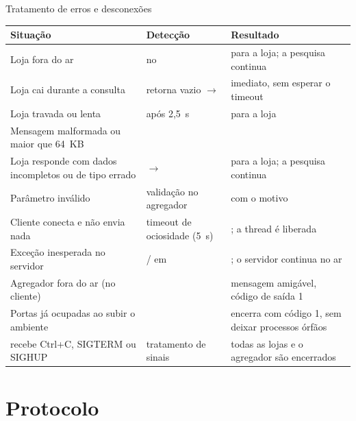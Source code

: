 \begin{quadro}[!htbp]
  \centering\small
  \caption{Tratamento de erros e desconexões}\label{qua:falhas}
  \begin{tabularx}{\textwidth}{|L{4.3cm}|L{4.4cm}|Y|}
    \hline
    \textbf{Situação} & \textbf{Detecção} & \textbf{Resultado} \\ \hline
    Loja fora do ar &  no  &  para a loja; a pesquisa continua \\ \hline
    Loja cai durante a consulta &  retorna vazio $\rightarrow$  &  imediato, sem esperar o timeout \\ \hline
    Loja travada ou lenta &  após 2,5~s &  para a loja \\ \hline
    Mensagem malformada ou maior que 64~KB &  &  \\ \hline
    Loja responde  com dados incompletos ou de tipo errado &  $\rightarrow$  &  para a loja; a pesquisa continua \\ \hline
    Parâmetro inválido & validação no agregador &  com o motivo \\ \hline
    Cliente conecta e não envia nada & timeout de ociosidade (5~s) & ; a thread é liberada \\ \hline
    Exceção inesperada no servidor & / em  & ; o servidor continua no ar \\ \hline
    Agregador fora do ar (no cliente) &  & mensagem amigável, código de saída 1 \\ \hline
    Portas já ocupadas ao subir o ambiente &  & encerra com código 1, sem deixar processos órfãos \\ \hline
     recebe Ctrl+C, SIGTERM ou SIGHUP & tratamento de sinais & todas as lojas e o agregador são encerrados \\ \hline
  \end{tabularx}
  \fonteautores
\end{quadro}

\section{Protocolo}

